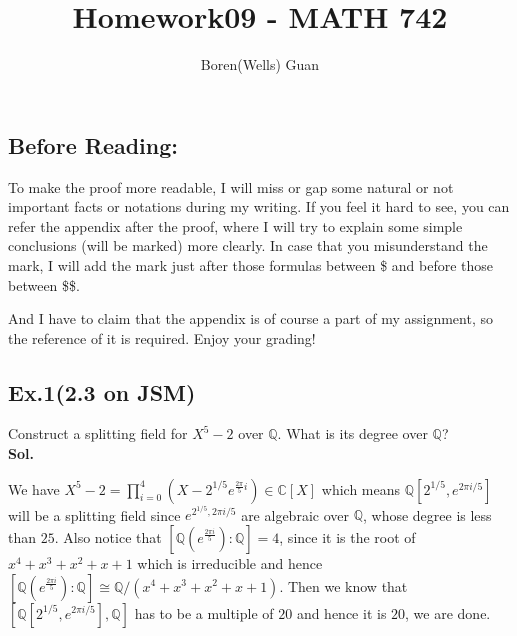 \documentclass[lang=en,11pt,a4paper,citestyle =authoryear]{elegantpaper}
\title{Homework09 - MATH 742}
\author{Boren(Wells) Guan}
\begin{document}
\maketitle

\subsection*{Before Reading:}\par
To make the proof more readable, I will miss or gap some natural or not important facts or notations during my writing. If you feel it hard to see, you can refer the appendix after the proof, where I will try to explain some simple conclusions (will be marked) more clearly. In case that you misunderstand the mark, I will add the mark just after those formulas between \$ and before those between \$\$.\par
And I have to claim that the appendix is of course a part of my assignment, so the reference of it is required. Enjoy your grading!

\subsection*{Ex.1(2.3 on JSM)}
Construct a splitting field for $X^5-2$ over $\mathbb{Q}$. What is its degree over $\mathbb{Q}$?
\vspace{0.5em}\\
\textbf{Sol.} \par
\iffalse 
    It is $\mathbb Q(\sqrt[5]{2},e^{\frac{2\pi i}{5}})$. Clearly $\sqrt[5]{2},\sqrt[5]{2}e^{\frac{2\pi i}{5}}$ are in the splitting field, so $e^{\frac{2\pi i}{5}}$ is in the splitting field. However, $\sqrt[5]{2}(e^{\frac{2\pi i}{5}})^j$ for $j=0,1,2,3,4$ are all the roots. 

Clearly, $[\mathbb Q(\sqrt[5]{2}):\mathbb Q]=5$ since $x^5-2$ is irreducible over $\mathbb Q$. 

On the other hand, $[\mathbb Q(e^{\frac{2\pi i}{5}}):\mathbb Q]=4$, as it is the root to $x^4+x^3+x^2+x+1$. Since $\gcd(4,5)=1$, we have $$[\mathbb \mathbb Q(\sqrt[5]{2},e^{\frac{2\pi i}{5}}):\mathbb Q]=20.$$
\fi
    We have $X^5-2 = \prod_{i=0}^4 (X - 2^{1/5}e^{\tfrac{2\pi}{5}i}) \in \mathbb{C}[X]$ which means $\mathbb{Q}[2^{1/5},e^{2\pi i/5}]$ will be a splitting field since $e^{2^{1/5},2\pi i/5}$ are algebraic over $\mathbb{Q}$, whose degree is less than $25$. Also notice that $[\mathbb {Q}(e^{\frac{2\pi i}{5}}):\mathbb {Q}]=4$, since it is the root of $x^4+x^3+x^2+x+1$ which is irreducible and hence $[\mathbb {Q}(e^{\frac{2\pi i}{5}}):\mathbb {Q}]\cong \mathbb{Q}/(x^4+x^3+x^2+x+1)$. Then we know that $[\mathbb{Q}[2^{1/5},e^{2\pi i/5}],\mathbb{Q}]$ has to be a multiple of $20$ and hence it is $20$, we are done.
\par 
\vspace{0.5em}
\end{document}
